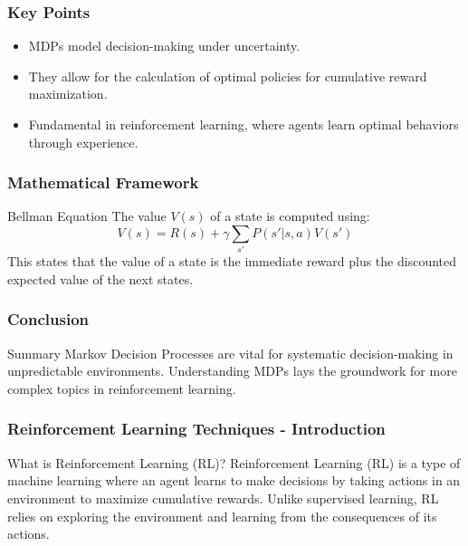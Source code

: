 \documentclass[aspectratio=169]{beamer}
\begin{document}
\begin{frame}[fragile]
  \frametitle{Key Points}
  \begin{itemize}
    \item MDPs model decision-making under uncertainty.
    \item They allow for the calculation of optimal policies for cumulative reward maximization.
    \item Fundamental in reinforcement learning, where agents learn optimal behaviors through experience.
  \end{itemize}
\end{frame}

\begin{frame}[fragile]
  \frametitle{Mathematical Framework}
  \begin{block}{Bellman Equation}
    The value $V(s)$ of a state is computed using:
    \begin{equation}
      V(s) = R(s) + \gamma \sum_{s'} P(s'|s, a)V(s')
    \end{equation}
    This states that the value of a state is the immediate reward plus the discounted expected value of the next states.
  \end{block}
\end{frame}

\begin{frame}[fragile]
  \frametitle{Conclusion}
  \begin{block}{Summary}
    Markov Decision Processes are vital for systematic decision-making in unpredictable environments. Understanding MDPs lays the groundwork for more complex topics in reinforcement learning.
  \end{block}
\end{frame}

\begin{frame}[fragile]
  \frametitle{Reinforcement Learning Techniques - Introduction}
  \begin{block}{What is Reinforcement Learning (RL)?}
    Reinforcement Learning (RL) is a type of machine learning where an agent learns to make decisions by taking actions in an environment to maximize cumulative rewards. Unlike supervised learning, RL relies on exploring the environment and learning from the consequences of its actions.
  \end{block}
\end{frame}
\end{document}
